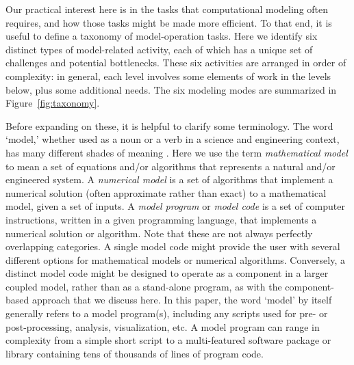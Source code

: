 \documentclass[12pt]{amsart}
\begin{document}
Our practical interest here is in the tasks that computational modeling often requires, and how those tasks might be made more efficient. To that end, it is useful to define a taxonomy of model-operation tasks. Here we identify six distinct types of model-related activity, each of which has a unique set of challenges and potential bottlenecks. These six activities are arranged in order of complexity: in general, each level involves some elements of work in the levels below, plus some additional needs. The six modeling modes are summarized in Figure~\ref{fig:taxonomy}.

Before expanding on these, it is helpful to clarify some terminology. The word `model,' whether used as a noun or a verb in a science and engineering context, has many different shades of meaning \citep[e.g.,][]{bras2003six}. Here we use the term \textit{mathematical model} to mean a set of equations and/or algorithms that represents a natural and/or engineered system. A \textit{numerical model} is a set of algorithms that implement a numerical solution (often approximate rather than exact) to a mathematical model, given a set of inputs. A \textit{model program} or \textit{model code} is a set of computer instructions, written in a given programming language, that implements a numerical solution or algorithm. Note that these are not always perfectly overlapping categories. A single model code might provide the user with several different options for mathematical models or numerical algorithms. Conversely, a distinct model code might be designed to operate as a component in a larger coupled model, rather than as a stand-alone program, as with the component-based approach that we discuss here. In this paper, the word `model' by itself generally refers to a model program(s), including any scripts used for pre- or post-processing, analysis, visualization, etc. A model program can range in complexity from a simple short script to a multi-featured software package or library containing tens of thousands of lines of program code.
\end{document}
